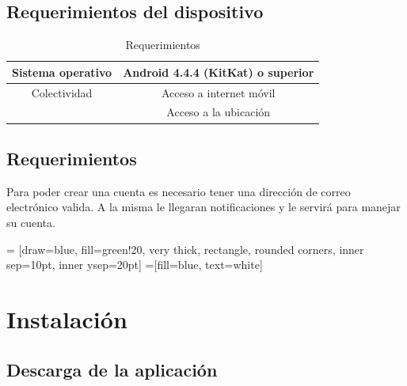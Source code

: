 \documentclass[10pt,letterpaper,extrafontsizes]{memoir}
\begin{document}
\section{Requerimientos del dispositivo}

\begin{table}[H]
\centering
\begin{tabular}{|c|c|}
\hline
Sistema operativo&Android 4.4.4 (KitKat) o superior\\ \hline
Colectividad&Acceso a internet móvil\\ \hline
&Acceso a la ubicación\\
\hline
\end{tabular}
\caption{Requerimientos}
\label{table:reqs}
\end{table}

\section{Requerimientos}

Para poder crear una cuenta es necesario tener una dirección de correo electrónico valida. A la misma le llegaran notificaciones y le servirá para manejar su cuenta.

\begin{center}
 = [draw=blue, fill=green!20, very thick,
    rectangle, rounded corners, inner sep=10pt, inner ysep=20pt]
 =[fill=blue, text=white]
\end{center}
%


\chapter{Instalación} \label{chap:primerUso}

\section{Descarga de la aplicación}
\end{document}

